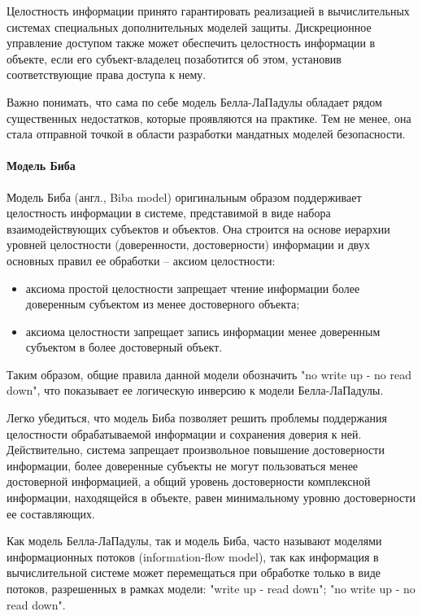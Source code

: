 Целостность информации принято гарантировать реализацией в вычислительных системах специальных дополнительных моделей защиты. Дискреционное управление доступом также может обеспечить целостность информации в объекте, если его субъект-владелец позаботится об этом, установив соответствующие права доступа к нему. 

Важно понимать, что сама по себе модель Белла-ЛаПадулы обладает рядом существенных недостатков, которые проявляются на практике. Тем не менее, она стала отправной точкой в области разработки мандатных моделей безопасности.

\paragraph{Модель Биба}

Модель Биба (англ., Biba model) оригинальным образом поддерживает целостность информации в системе, представимой в виде набора взаимодействующих субъектов и объектов. Она строится на основе иерархии уровней целостности (доверенности, достоверности) информации и двух основных правил ее обработки -- аксиом целостности: 

\begin{itemize}
	\item аксиома простой целостности запрещает чтение информации более доверенным субъектом из менее достоверного объекта; 
	\item аксиома целостности запрещает запись информации менее доверенным субъектом в более достоверный объект. 
\end{itemize}

Таким образом, общие правила данной модели обозначить "no write up - no read down", что показывает ее логическую инверсию к модели Белла-ЛаПадулы. 

Легко убедиться, что модель Биба позволяет решить проблемы поддержания целостности обрабатываемой информации и сохранения доверия к ней. Действительно, система запрещает произвольное повышение достоверности информации, более доверенные субъекты не могут пользоваться менее достоверной информацией, а общий уровень достоверности комплексной информации, находящейся в объекте, равен минимальному уровню достоверности ее составляющих. 

Как модель Белла-ЛаПадулы, так и модель Биба, часто называют моделями информационных потоков (information-flow model), так как информация в вычислительной системе может перемещаться при обработке только в виде потоков, разрешенных в рамках модели: "write up - read down"; "no write up - no read down". 

